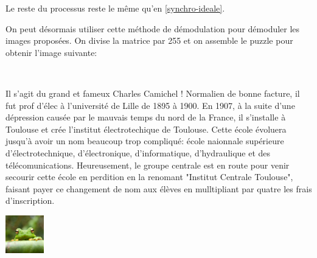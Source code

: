\documentclass{article}
\begin{document}
Le reste du processus reste le même qu'en \ref{synchro-ideale}.


\begin{figure}

\end{figure}

On peut désormais utiliser cette méthode de démodulation pour démoduler les images proposées. On divise la matrice par 255 et on assemble le puzzle pour obtenir l'image suivante:

\begin{center}
	\includegraphics[width=0.5]{camichet.png}
\end{center}

Il s'agit du grand et fameux Charles Camichel ! Normalien de bonne facture, il fut prof d'élec à l'université de Lille de 1895 à 1900. En 1907, à la suite d'une dépression causée par le mauvais temps du nord de la France, il s'installe à Toulouse et crée l'institut électrotechique de Toulouse. Cette école évoluera jusqu'à avoir un nom beaucoup trop compliqué: école naionnale supérieure d'électrotechnique, d'électronique, d'informatique, d'hydraulique et des télécomunications. Heureusement, le groupe centrale est en route pour venir secourir cette école en perdition en la renomant "Institut Centrale Toulouse", faisant payer ce changement de nom aux élèves en mulltipliant par quatre les frais d'inscription.


\begin{center}
    \includegraphics[width=0.125\textwidth]{frog.jpg}
\end{center}
\end{document}
